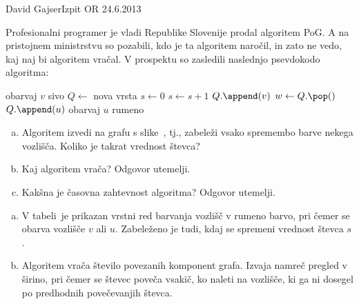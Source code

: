 \begin{naloga}{David Gajser}{Izpit OR 24.6.2013}
\begin{vprasanje}
Profesionalni programer je vladi Republike Slovenije
prodal algoritem {\sc PoG}.
A na pristojnem ministrstvu so pozabili, kdo je ta algoritem naročil,
in zato ne vedo, kaj naj bi algoritem vračal.
V prospektu so zasledili naslednjo psevdokodo algoritma:
\begin{small}
\begin{algorithmic}
    \State obarvaj $v$ sivo
\EndFor
\State $Q \gets$ nova vrsta
\State $s \gets 0$
        \State $s \gets s+1$
        \State $Q.\append(v)$
            \State $w \gets Q.\pop()$
                    \State $Q.\append(u)$
                    \State obarvaj $u$ rumeno
                \EndIf
            \EndFor
        \EndWhile
    \EndIf
\EndFor
\State {}
\end{algorithmic}
\end{small}

\begin{enumerate}[(a)]
\item Algoritem izvedi na grafu s slike~\fig,
tj., zabeleži vsako spremembo barve nekega vozlišča.
Koliko je takrat vrednost števca?

\item Kaj algoritem vrača?
Odgovor utemelji.

\item Kakšna je časovna zahtevnost algoritma?
Odgovor utemelji.
\end{enumerate}

\begin{slika}
\pgfslika
{}
\end{slika}
\end{vprasanje}

\begin{odgovor}
\begin{enumerate}[(a)]
\item V tabeli~\tab je prikazan vrstni red barvanja vozlišč v rumeno barvo,
pri čemer se obarva vozlišče $v$ ali $u$.
Zabeleženo je tudi, kdaj se spremeni vrednost števca $s$.

\item Algoritem vrača število povezanih komponent grafa.
Izvaja namreč pregled v širino,
pri čemer se števec poveča vsakič, ko naleti na vozlišče,
ki ga ni dosegel po predhodnih povečevanjih števca.


\end{enumerate}
\end{odgovor}
\end{naloga}
